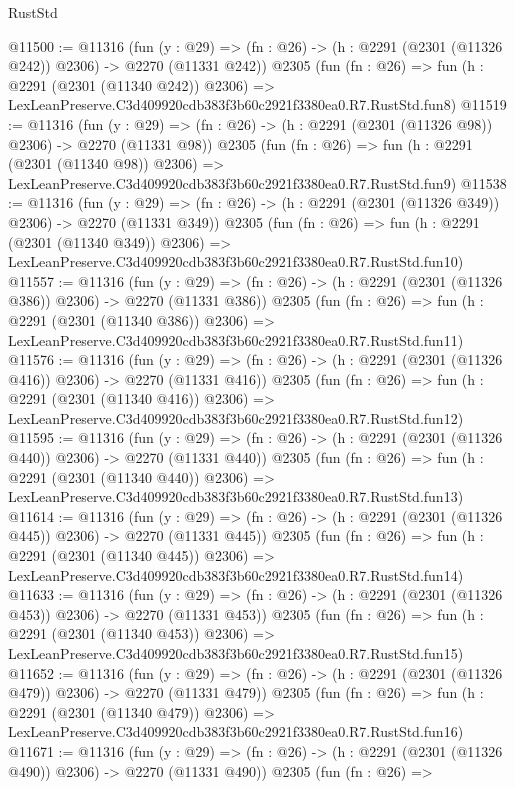 \begin{lexlean}{RustStd}
\begin{coremodule}
@11500 := @11316
    (fun (y : @29) => (fn : @26) -> (h : @2291 (@2301 (@11326 @242)) @2306) -> @2270 (@11331 @242))
    @2305
    (fun (fn : @26) =>
    fun (h : @2291 (@2301 (@11340 @242)) @2306) =>
    LexLeanPreserve.C3d409920cdb383f3b60c2921f3380ea0.R7.RustStd.fun8)
@11519 := @11316
    (fun (y : @29) => (fn : @26) -> (h : @2291 (@2301 (@11326 @98)) @2306) -> @2270 (@11331 @98))
    @2305
    (fun (fn : @26) =>
    fun (h : @2291 (@2301 (@11340 @98)) @2306) =>
    LexLeanPreserve.C3d409920cdb383f3b60c2921f3380ea0.R7.RustStd.fun9)
@11538 := @11316
    (fun (y : @29) => (fn : @26) -> (h : @2291 (@2301 (@11326 @349)) @2306) -> @2270 (@11331 @349))
    @2305
    (fun (fn : @26) =>
    fun (h : @2291 (@2301 (@11340 @349)) @2306) =>
    LexLeanPreserve.C3d409920cdb383f3b60c2921f3380ea0.R7.RustStd.fun10)
@11557 := @11316
    (fun (y : @29) => (fn : @26) -> (h : @2291 (@2301 (@11326 @386)) @2306) -> @2270 (@11331 @386))
    @2305
    (fun (fn : @26) =>
    fun (h : @2291 (@2301 (@11340 @386)) @2306) =>
    LexLeanPreserve.C3d409920cdb383f3b60c2921f3380ea0.R7.RustStd.fun11)
@11576 := @11316
    (fun (y : @29) => (fn : @26) -> (h : @2291 (@2301 (@11326 @416)) @2306) -> @2270 (@11331 @416))
    @2305
    (fun (fn : @26) =>
    fun (h : @2291 (@2301 (@11340 @416)) @2306) =>
    LexLeanPreserve.C3d409920cdb383f3b60c2921f3380ea0.R7.RustStd.fun12)
@11595 := @11316
    (fun (y : @29) => (fn : @26) -> (h : @2291 (@2301 (@11326 @440)) @2306) -> @2270 (@11331 @440))
    @2305
    (fun (fn : @26) =>
    fun (h : @2291 (@2301 (@11340 @440)) @2306) =>
    LexLeanPreserve.C3d409920cdb383f3b60c2921f3380ea0.R7.RustStd.fun13)
@11614 := @11316
    (fun (y : @29) => (fn : @26) -> (h : @2291 (@2301 (@11326 @445)) @2306) -> @2270 (@11331 @445))
    @2305
    (fun (fn : @26) =>
    fun (h : @2291 (@2301 (@11340 @445)) @2306) =>
    LexLeanPreserve.C3d409920cdb383f3b60c2921f3380ea0.R7.RustStd.fun14)
@11633 := @11316
    (fun (y : @29) => (fn : @26) -> (h : @2291 (@2301 (@11326 @453)) @2306) -> @2270 (@11331 @453))
    @2305
    (fun (fn : @26) =>
    fun (h : @2291 (@2301 (@11340 @453)) @2306) =>
    LexLeanPreserve.C3d409920cdb383f3b60c2921f3380ea0.R7.RustStd.fun15)
@11652 := @11316
    (fun (y : @29) => (fn : @26) -> (h : @2291 (@2301 (@11326 @479)) @2306) -> @2270 (@11331 @479))
    @2305
    (fun (fn : @26) =>
    fun (h : @2291 (@2301 (@11340 @479)) @2306) =>
    LexLeanPreserve.C3d409920cdb383f3b60c2921f3380ea0.R7.RustStd.fun16)
@11671 := @11316
    (fun (y : @29) => (fn : @26) -> (h : @2291 (@2301 (@11326 @490)) @2306) -> @2270 (@11331 @490))
    @2305
    (fun (fn : @26) =>

\end{coremodule}
\end{lexlean}
